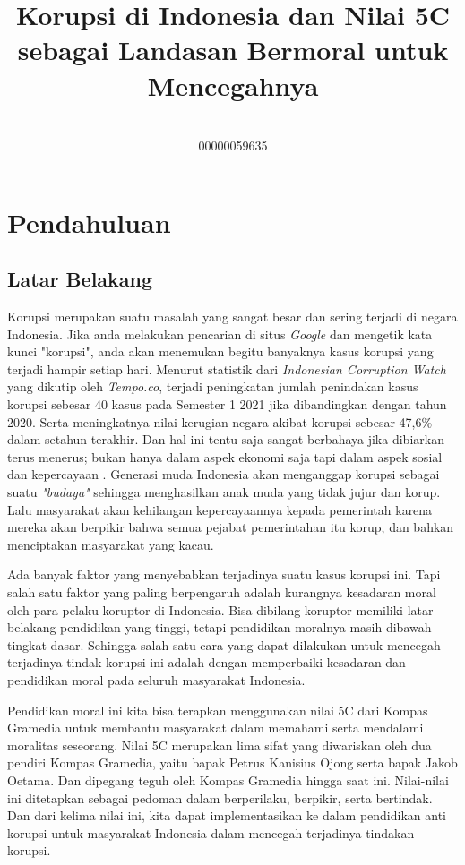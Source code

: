 \documentclass[11pt]{article}
\title{Korupsi di Indonesia dan Nilai 5C sebagai Landasan Bermoral untuk Mencegahnya}
\author{\theauthor \\ 00000059635 \\ {\small\affiliation}}
\date{}
\begin{document}
\maketitle
\section{Pendahuluan}
    \subsection{Latar Belakang}
    Korupsi merupakan suatu masalah yang sangat besar dan sering terjadi di negara
    Indonesia. Jika anda melakukan pencarian di situs \emph{Google} dan mengetik
    kata kunci "korupsi", anda akan menemukan begitu banyaknya kasus korupsi yang
    terjadi hampir setiap hari. Menurut statistik dari \emph{Indonesian Corruption Watch}
    yang dikutip oleh \emph{Tempo.co}, terjadi peningkatan jumlah penindakan kasus 
    korupsi sebesar 40 kasus pada Semester 1 2021 jika dibandingkan dengan tahun 2020. 
    Serta meningkatnya nilai kerugian negara akibat korupsi sebesar 47,6\% dalam 
    setahun terakhir. Dan hal ini tentu saja sangat berbahaya jika dibiarkan terus
    menerus; bukan hanya dalam aspek ekonomi saja tapi dalam aspek sosial dan
    kepercayaan \citep{setiadiKORUPSIDIINDONESIA2018}.
    Generasi muda Indonesia akan menganggap korupsi sebagai suatu \emph{"budaya"}
    sehingga menghasilkan anak muda yang tidak jujur dan korup. Lalu masyarakat
    akan kehilangan kepercayaannya kepada pemerintah karena mereka akan berpikir
    bahwa semua pejabat pemerintahan itu korup, dan bahkan menciptakan masyarakat 
    yang kacau.

    Ada banyak faktor yang menyebabkan terjadinya suatu kasus korupsi ini. Tapi 
    salah satu faktor yang paling berpengaruh adalah kurangnya kesadaran moral 
    oleh para pelaku koruptor di Indonesia. Bisa dibilang koruptor memiliki latar
    belakang pendidikan yang tinggi, tetapi pendidikan moralnya masih dibawah 
    tingkat dasar. Sehingga salah satu cara yang dapat dilakukan untuk mencegah
    terjadinya tindak korupsi ini adalah dengan memperbaiki kesadaran dan pendidikan
    moral pada seluruh masyarakat Indonesia. 

    Pendidikan moral ini kita bisa terapkan menggunakan nilai 5C dari Kompas
    Gramedia untuk membantu masyarakat dalam memahami serta mendalami moralitas 
    seseorang. Nilai 5C merupakan lima sifat yang diwariskan oleh dua pendiri Kompas
    Gramedia, yaitu bapak Petrus Kanisius Ojong serta bapak Jakob Oetama. Dan 
    dipegang teguh oleh Kompas Gramedia hingga saat ini. Nilai-nilai ini ditetapkan
    sebagai pedoman dalam berperilaku, berpikir, serta bertindak. Dan dari kelima
    nilai ini, kita dapat implementasikan ke dalam pendidikan anti korupsi untuk
    masyarakat Indonesia dalam mencegah terjadinya tindakan korupsi.
\end{document}
